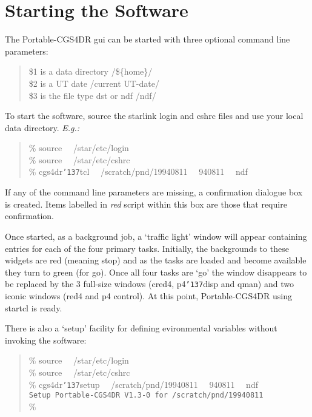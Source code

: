 \documentclass[a4paper]{book}
\renewcommand{\_}{{\tt\char'137}}
\begin{document}
\section{Starting the Software}
The Portable-CGS4DR {\sc gui} can be started with three optional command line
parameters:

\begin{minipage}{120mm}
\begin{quote}
  \$1 is a data directory \hfill /\$\{home\}/ \\
  \$2 is a UT date \hfill /current UT-date/ \\
  \$3 is the file type {\sc dst} or {\sc ndf} \hfill /ndf/
\end{quote}
\end{minipage}

To start the software, source the {\sc starlink} login and cshrc files and
use your local data directory. {\em E.g.:}

\begin{minipage}{120mm}
\begin{quote}
  \%  source \ \ /star/etc/login \\
  \%  source \ \ /star/etc/cshrc \\
  \%  cgs4dr\_tcl \ \ /scratch/pnd/19940811 \ \ 940811 \ \ ndf
\end{quote}
\end{minipage}

If any of the command line parameters are missing, a confirmation dialogue box
is created. Items labelled in {\em red} script within this box are those that
require confirmation.

Once started, as a background job, a `traffic light' window will appear containing entries
for each of the four primary tasks. Initially, the backgrounds to these widgets are red
(meaning stop) and as the tasks are loaded and become available they turn to green (for go).
Once all four tasks are `go' the window disappears to be replaced by the
3 full-size windows (cred4, p4\_disp and qman) and two iconic windows
(red4 and p4 control). At this point, Portable-CGS4DR using {\sc startcl} is
ready.

There is also a `setup' facility for defining evironmental variables without
invoking the software:

\begin{minipage}{120mm}
\begin{quote}
  \%  source \ \ /star/etc/login \\
  \%  source \ \ /star/etc/cshrc \\
  \%  cgs4dr\_setup \ \ /scratch/pnd/19940811 \ \ 940811 \ \ ndf \\[4ex]
      {\tt Setup Portable-CGS4DR V1.3-0 for /scratch/pnd/19940811} \\[2ex]
  \%
\end{quote}
\end{minipage}
\end{document}
